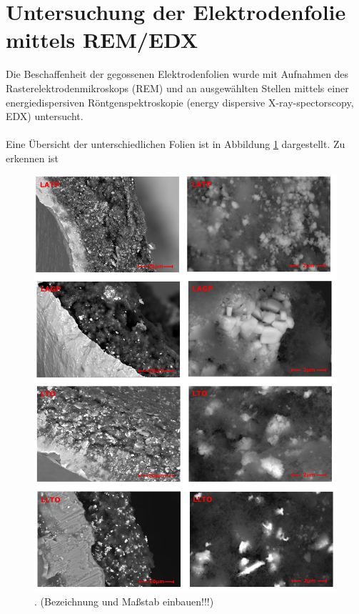 \documentclass[a4paper, 11pt, headsepline,footsepline,twoside,abstract]{scrbook}
\begin{document}
\section{Untersuchung der Elektrodenfolie mittels REM/EDX}
Die Beschaffenheit der gegossenen Elektrodenfolien wurde mit Aufnahmen des Rasterelektrodenmikroskops (REM) und an ausgewählten Stellen mittels einer energiedispersiven Röntgenspektroskopie (energy dispersive X-ray-spectorscopy, EDX) untersucht.
\\\\
Eine Übersicht der unterschiedlichen Folien ist in Abbildung \ref{uebersicht_rem} dargestellt. Zu erkennen ist
\begin{figure}
	\centering
	\includegraphics[width=1.0\columnwidth]{images/Uebersicht_REM.jpg}
	\caption{. (Bezeichnung und Maßstab einbauen!!!)}
	\label{uebersicht_rem}
\end{figure}
\newpage
\end{document}
